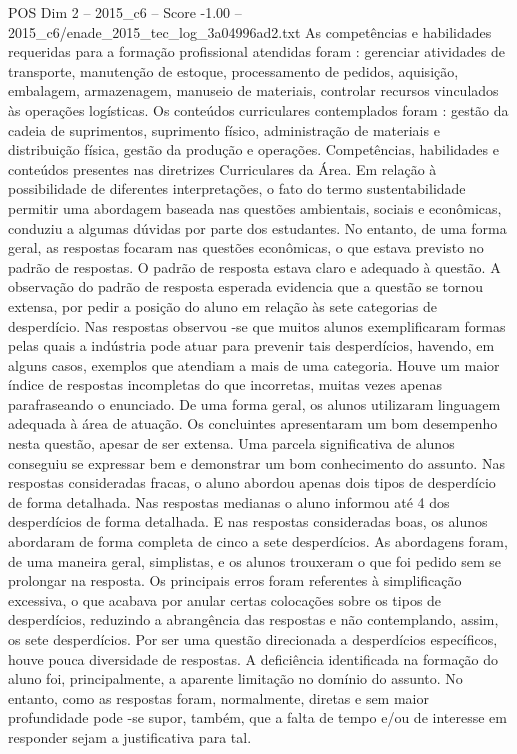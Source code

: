 \begin{textsample}{POS Dim 2 – 2015\_c6 – Score -1.00 – 2015\_c6/enade\_2015\_tec\_log\_3a04996ad2.txt}
As competências e habilidades requeridas para a formação profissional atendidas foram : gerenciar atividades de transporte, manutenção de estoque, processamento de pedidos, aquisição, embalagem, armazenagem, manuseio de materiais, controlar recursos vinculados às operações logísticas.
Os conteúdos curriculares contemplados foram : gestão da cadeia de suprimentos, suprimento físico, administração de materiais e distribuição física, gestão da produção e operações.
Competências, habilidades e conteúdos presentes nas diretrizes Curriculares da Área.
Em relação à possibilidade de diferentes interpretações, o fato do termo sustentabilidade permitir uma abordagem baseada nas questões ambientais, sociais e econômicas, conduziu a algumas dúvidas por parte dos estudantes.
No entanto, de uma forma geral, as respostas focaram nas questões econômicas, o que estava previsto no padrão de respostas.
O padrão de resposta estava claro e adequado à questão.
A observação do padrão de resposta esperada evidencia que a questão se tornou extensa, por pedir a posição do aluno em relação às sete categorias de desperdício.
Nas respostas observou -se que muitos alunos exemplificaram formas pelas quais a indústria pode atuar para prevenir tais desperdícios, havendo, em alguns casos, exemplos que atendiam a mais de uma categoria.
Houve um maior índice de respostas incompletas do que incorretas, muitas vezes apenas parafraseando o enunciado.
De uma forma geral, os alunos utilizaram linguagem adequada à área de atuação.
Os concluintes apresentaram um bom desempenho nesta questão, apesar de ser extensa.
Uma parcela significativa de alunos conseguiu se expressar bem e demonstrar um bom conhecimento do assunto.
Nas respostas consideradas fracas, o aluno abordou apenas dois tipos de desperdício de forma detalhada.
Nas respostas medianas o aluno informou até 4 dos desperdícios de forma detalhada.
E nas respostas consideradas boas, os alunos abordaram de forma completa de cinco a sete desperdícios.
As abordagens foram, de uma maneira geral, simplistas, e os alunos trouxeram o que foi pedido sem se prolongar na resposta.
Os principais erros foram referentes à simplificação excessiva, o que acabava por anular certas colocações sobre os tipos de desperdícios, reduzindo a abrangência das respostas e não contemplando, assim, os sete desperdícios.
Por ser uma questão direcionada a desperdícios específicos, houve pouca diversidade de respostas.
A deficiência identificada na formação do aluno foi, principalmente, a aparente limitação no domínio do assunto.
No entanto, como as respostas foram, normalmente, diretas e sem maior profundidade pode -se supor, também, que a falta de tempo e/ou de interesse em responder sejam a justificativa para tal.

\end{textsample}
